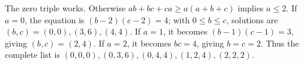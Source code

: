 The zero triple works. Otherwise $ab+bc+ca\ge a(a+b+c)$ implies $a\le2$. If $a=0$, the equation is $(b-2)(c-2)=4$; with $0\le b\le c$, solutions are $(b,c)=(0,0),(3,6),(4,4)$. If $a=1$, it becomes $(b-1)(c-1)=3$, giving $(b,c)=(2,4)$. If $a=2$, it becomes $bc=4$, giving $b=c=2$. Thus the complete list is $\boxed{(0,0,0),(0,3,6),(0,4,4),(1,2,4),(2,2,2)}$.
